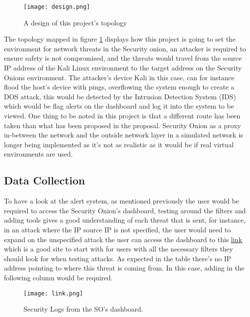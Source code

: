 \documentclass[12pt]{article}
\begin{document}
		
		\begin{center}
			\begin{figure}[H]
				\centering
				\texttt{[image: design.png]}
				\caption{A design of this project's topology} 
				\label{fig:design}
			\end{figure}
		\end{center}
		
		The topology mapped in figure \ref{fig:design} displays how this project is going to set the environment for network threats in the Security onion, an attacker is required to ensure safety is not compromised, and the threats would travel from the source IP address of the Kali Linux environment to the target address on the Security Onions environment. The attacker's device Kali in this case, can for instance flood the host's device with pings, overflowing the system enough to create a DOS attack, this would be detected by the Intrusion Detection System (IDS) which would be flag alerts on the dashboard and log it into the system to be viewed. One thing to be noted in this project is that a different route has been taken than what has been proposed in the proposal. Security Onion as a proxy in-between the network and the outside network layer in a simulated network is longer being implemented as it's not as realistic as it would be if real virtual environments are used.
		\subsection{Data Collection}
		To have a look at the alert system, as mentioned previously the user would be required to access the Security Onion's dashboard, testing around the filters and adding tools gives a good understanding of each threat that is sent, for instance, in an attack where the IP source IP is not specified, the user would need to expand on the unspecified attack the user can access the dashboard to this  \href{https://10.0.2.0/kibana/app/dashboards#/view/30d0ac90-729f-11ea-8dd2-9d8795a1200b?_g=(filters:!(),refreshInterval:(pause:!t,value:0),time:(from:now-24h,mode:quick,to:now))}{link} which is a good site to start with for users with all the necessary filters they should look for when testing attacks. As expected in the table there's no IP address pointing to where this threat is coming from. In this case, adding in the following column would be required.
		\begin{center}
			\begin{figure}[H]
				\centering
				\texttt{[image: link.png]}
				\caption{Security Logs from the SO's dashboard. } 
				\label{fig:18}
			\end{figure}
		\end{center}
		
\end{document}
